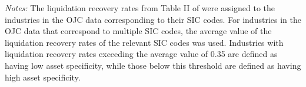 \begin{table}[ht]
\begin{threeparttable}
\begin{tablenotes}
\item \textit{Notes: } 
 The liquidation recovery rates from Table II of \cite{kermani2023asset} were assigned to the industries in the OJC data corresponding to their SIC codes. For industries in the OJC data that correspond to multiple SIC codes, the average value of the liquidation recovery rates of the relevant SIC codes was used. Industries with liquidation recovery rates exceeding the average value of 0.35 are defined as having low asset specificity, while those below this threshold are defined as having high asset specificity.
 \end{tablenotes}
\end{threeparttable}
\end{table}
